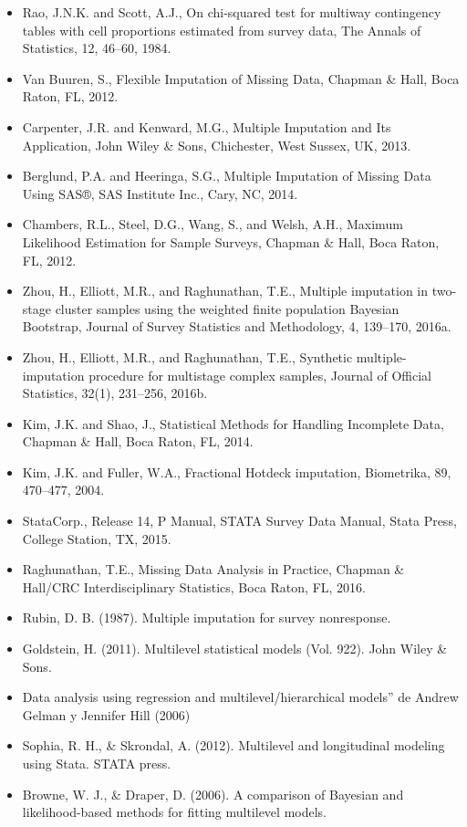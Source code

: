\documentclass[
  12pt,
]{book}
\begin{document}
\begin{itemize}
\item
  Rao, J.N.K. and Scott, A.J., On chi-squared test for multiway contingency tables with cell proportions estimated from survey data, The Annals of Statistics, 12, 46--60, 1984.
\item
  Van Buuren, S., Flexible Imputation of Missing Data, Chapman \& Hall, Boca Raton, FL, 2012.
\item
  Carpenter, J.R. and Kenward, M.G., Multiple Imputation and Its Application, John Wiley \& Sons, Chichester, West Sussex, UK, 2013.
\item
  Berglund, P.A. and Heeringa, S.G., Multiple Imputation of Missing Data Using SAS®, SAS Institute Inc., Cary, NC, 2014.
\item
  Chambers, R.L., Steel, D.G., Wang, S., and Welsh, A.H., Maximum Likelihood Estimation for Sample Surveys, Chapman \& Hall, Boca Raton, FL, 2012.
\item
  Zhou, H., Elliott, M.R., and Raghunathan, T.E., Multiple imputation in two-stage cluster samples using the weighted finite population Bayesian Bootstrap, Journal of Survey Statistics and Methodology, 4, 139--170, 2016a.
\item
  Zhou, H., Elliott, M.R., and Raghunathan, T.E., Synthetic multiple-imputation procedure for multistage complex samples, Journal of Official Statistics, 32(1), 231--256, 2016b.
\item
  Kim, J.K. and Shao, J., Statistical Methods for Handling Incomplete Data, Chapman \& Hall, Boca Raton, FL, 2014.
\item
  Kim, J.K. and Fuller, W.A., Fractional Hotdeck imputation, Biometrika, 89, 470--477, 2004.
\item
  StataCorp., Release 14, P Manual, STATA Survey Data Manual, Stata Press, College Station, TX, 2015.
\item
  Raghunathan, T.E., Missing Data Analysis in Practice, Chapman \& Hall/CRC Interdisciplinary Statistics, Boca Raton, FL, 2016.
\item
  Rubin, D. B. (1987). Multiple imputation for survey nonresponse.
\item
  Goldstein, H. (2011). Multilevel statistical models (Vol. 922). John Wiley \& Sons.
\item
  Data analysis using regression and multilevel/hierarchical models'' de Andrew Gelman y Jennifer Hill (2006)
\item
  Sophia, R. H., \& Skrondal, A. (2012). Multilevel and longitudinal modeling using Stata. STATA press.
\item
  Browne, W. J., \& Draper, D. (2006). A comparison of Bayesian and likelihood-based methods for fitting multilevel models.
\end{itemize}
\end{document}
